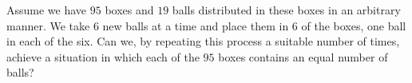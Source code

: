 Assume we have $95$ boxes and $19$ balls distributed in these boxes in an arbitrary manner. We take $6$ new balls at a time and place them in $6$ of the boxes, one ball in each of the six. Can we, by repeating this process a suitable number of times, achieve a situation in which each of the $95$ boxes contains an equal number of balls?
